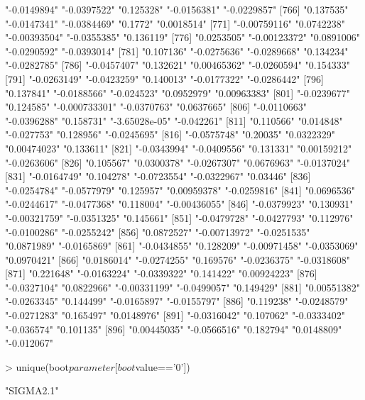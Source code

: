 \begin{Schunk}
\begin{Soutput}
[761] "-0.0149894"   "-0.0397522"   "0.125328"     "-0.0156381"   "-0.0229857"  
[766] "0.137535"     "-0.0147341"   "-0.0384469"   "0.1772"       "0.0018514"   
[771] "-0.00759116"  "0.0742238"    "-0.00393504"  "-0.0355385"   "0.136119"    
[776] "0.0253505"    "-0.00123372"  "0.0891006"    "-0.0290592"   "-0.0393014"  
[781] "0.107136"     "-0.0275636"   "-0.0289668"   "0.134234"     "-0.0282785"  
[786] "-0.0457407"   "0.132621"     "0.00465362"   "-0.0260594"   "0.154333"    
[791] "-0.0263149"   "-0.0423259"   "0.140013"     "-0.0177322"   "-0.0286442"  
[796] "0.137841"     "-0.0188566"   "-0.024523"    "0.0952979"    "0.00963383"  
[801] "-0.0239677"   "0.124585"     "-0.000733301" "-0.0370763"   "0.0637665"   
[806] "-0.0110663"   "-0.0396288"   "0.158731"     "-3.65028e-05" "-0.042261"   
[811] "0.110566"     "0.014848"     "-0.027753"    "0.128956"     "-0.0245695"  
[816] "-0.0575748"   "0.20035"      "0.0322329"    "0.00474023"   "0.133611"    
[821] "-0.0343994"   "-0.0409556"   "0.131331"     "0.00159212"   "-0.0263606"  
[826] "0.105567"     "0.0300378"    "-0.0267307"   "0.0676963"    "-0.0137024"  
[831] "-0.0164749"   "0.104278"     "-0.0723554"   "-0.0322967"   "0.03446"     
[836] "-0.0254784"   "-0.0577979"   "0.125957"     "0.00959378"   "-0.0259816"  
[841] "0.0696536"    "-0.0244617"   "-0.0477368"   "0.118004"     "-0.00436055" 
[846] "-0.0379923"   "0.130931"     "-0.00321759"  "-0.0351325"   "0.145661"    
[851] "-0.0479728"   "-0.0427793"   "0.112976"     "-0.0100286"   "-0.0255242"  
[856] "0.0872527"    "-0.00713972"  "-0.0251535"   "0.0871989"    "-0.0165869"  
[861] "-0.0434855"   "0.128209"     "-0.00971458"  "-0.0353069"   "0.0970421"   
[866] "0.0186014"    "-0.0274255"   "0.169576"     "-0.0236375"   "-0.0318608"  
[871] "0.221648"     "-0.0163224"   "-0.0339322"   "0.141422"     "0.00924223"  
[876] "-0.0327104"   "0.0822966"    "-0.00331199"  "-0.0499057"   "0.149429"    
[881] "0.00551382"   "-0.0263345"   "0.144499"     "-0.0165897"   "-0.0155797"  
[886] "0.119238"     "-0.0248579"   "-0.0271283"   "0.165497"     "0.0148976"   
[891] "-0.0316042"   "0.107062"     "-0.0333402"   "-0.036574"    "0.101135"    
[896] "0.00445035"   "-0.0566516"   "0.182794"     "0.0148809"    "-0.012067"   
\end{Soutput}
\begin{Sinput}
> unique(boot$parameter[boot$value=='0'])
\end{Sinput}
\begin{Soutput}
[1] "SIGMA2.1"
\end{Soutput}
\end{Schunk}

